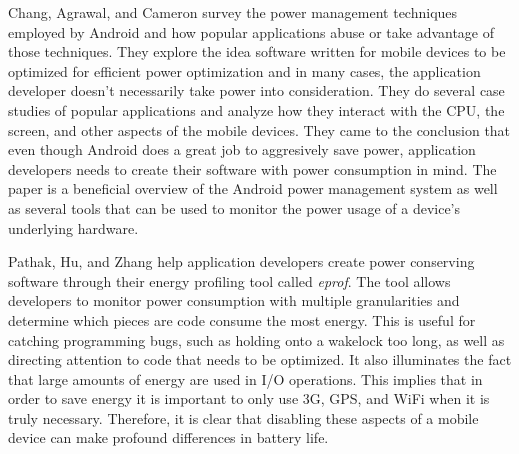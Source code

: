 Chang, Agrawal, and Cameron survey the power management techniques employed by Android and how popular applications abuse or take advantage of those techniques\cite{energy-aware}.
They explore the idea software written for mobile devices to be optimized for efficient power optimization and in many cases, the application developer doesn't necessarily take power into
consideration.
They do several case studies of popular applications and analyze how they interact with the CPU, the screen, and other aspects of the mobile devices. 
They came to the conclusion that even though Android does a great job to aggresively save power, application developers needs to create their software with power consumption in mind.
The paper is a beneficial overview of the Android power management system as well as several tools that can be used to monitor the power usage of a device's underlying hardware.

Pathak, Hu, and Zhang help application developers create power conserving software through their energy profiling tool called \emph{eprof}\cite{eprof}.
The tool allows developers to monitor power consumption with multiple granularities and determine which pieces are code consume the most energy.
This is useful for catching programming bugs, such as holding onto a wakelock too long, as well as directing attention to code that needs to be optimized.
It also illuminates the fact that large amounts of energy are used in I/O operations. 
This implies that in order to save energy it is important to only use 3G, GPS, and WiFi when it is truly necessary.
Therefore, it is clear that disabling these aspects of a mobile device can make profound differences in battery life.



